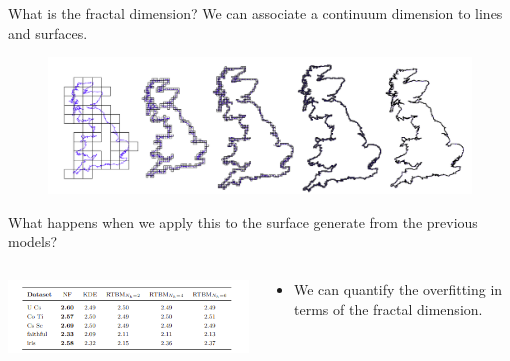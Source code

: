 \documentclass[10pt]{beamer}
\begin{document}
\begin{frame}{What is the fractal dimension?}
    We can associate a continuum dimension to lines and surfaces.
    \begin{figure}
        \includegraphics[width=\textwidth]{figures/coastlineboxmaps.png}
    \end{figure}
    What happens when we apply this to the surface generate from the previous models?
    \begin{columns}
        \begin{column}{0.7 \textwidth}
            \includegraphics[width= \textwidth]{figures/FD_table.png}
        \end{column}

        \begin{column}{0.3 \textwidth}
            \begin{itemize}
                \item[\faArrowRight] We can quantify the overfitting in terms of the fractal dimension. 
            \end{itemize}
        \end{column}
    \end{columns}
    
\end{frame}
\end{document}

